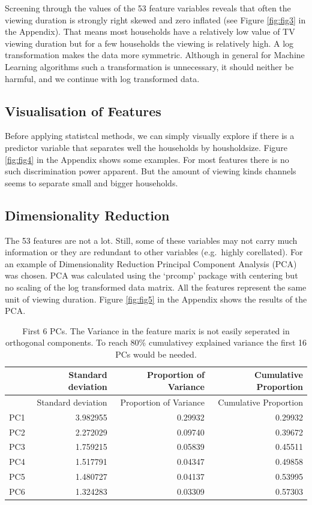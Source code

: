 \documentclass[]{article}
\begin{document}
Screening through the values of the 53 feature variables reveals that
often the viewing duration is strongly right skewed and zero inflated
(see Figure \ref{fig:fig3} in the Appendix). That means most households
have a relatively low value of TV viewing duration but for a few
households the viewing is relatively high. A log transformation makes
the data more symmetric. Although in general for Machine Learning
algorithms such a transformation is unnecessary, it should neither be
harmful, and we continue with log transformed data.

\subsection{Visualisation of Features}\label{visualisation-of-features}

Before applying statistcal methods, we can simply visually explore if
there is a predictor variable that separates well the households by
housholdsize. Figure \ref{fig:fig4} in the Appendix shows some examples.
For most features there is no such discrimination power apparent. But
the amount of viewing kinds channels seems to separate small and bigger
households.

\subsection{Dimensionality Reduction}\label{dimensionality-reduction}

The 53 features are not a lot. Still, some of these variables may not
carry much information or they are redundant to other variables
(e.g.~highly corellated). For an example of Dimensionality Reduction
Principal Component Analysis (PCA) was chosen. PCA was calculated using
the `prcomp' package with centering but no scaling of the log
transformed data matrix. All the features represent the same unit of
viewing duration. Figure \ref{fig:fig5} in the Appendix shows the
results of the PCA.

\begin{longtable}[]{@{}lrrr@{}}
\caption{\label{tab:tab5} First 6 PCs. The Variance in the feature marix
is not easily seperated in orthogonal components. To reach 80\%
cumulativey explained variance the first 16 PCs would be
needed.}\tabularnewline
\toprule
& Standard deviation & Proportion of Variance & Cumulative
Proportion\tabularnewline
\midrule
\endfirsthead
\toprule
& Standard deviation & Proportion of Variance & Cumulative
Proportion\tabularnewline
\midrule
\endhead
PC1 & 3.982955 & 0.29932 & 0.29932\tabularnewline
PC2 & 2.272029 & 0.09740 & 0.39672\tabularnewline
PC3 & 1.759215 & 0.05839 & 0.45511\tabularnewline
PC4 & 1.517791 & 0.04347 & 0.49858\tabularnewline
PC5 & 1.480727 & 0.04137 & 0.53995\tabularnewline
PC6 & 1.324283 & 0.03309 & 0.57303\tabularnewline
\bottomrule
\end{longtable}
\end{document}
